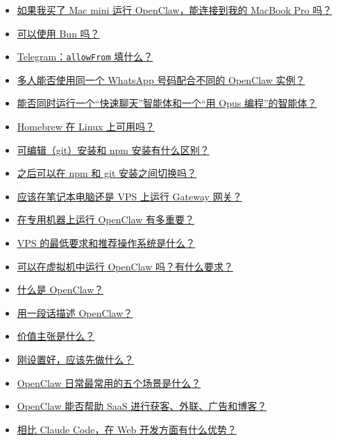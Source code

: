 \begin{itemize}
  \item \href{\#if-i-buy-a-mac-mini-to-run-openclaw-can-i-connect-it-to-my-macbook-pro}{如果我买了 Mac mini 运行 OpenClaw，能连接到我的 MacBook Pro 吗？}
  \item \href{\#can-i-use-bun}{可以使用 Bun 吗？}
  \item \href{\#telegram-what-goes-in-allowfrom}{Telegram：\texttt{allowFrom} 填什么？}
  \item \href{\#can-multiple-people-use-one-whatsapp-number-with-different-openclaw-instances}{多人能否使用同一个 WhatsApp 号码配合不同的 OpenClaw 实例？}
  \item \href{\#can-i-run-a-fast-chat-agent-and-an-opus-for-coding-agent}{能否同时运行一个“快速聊天”智能体和一个“用 Opus 编程”的智能体？}
  \item \href{\#does-homebrew-work-on-linux}{Homebrew 在 Linux 上可用吗？}
  \item \href{\#whats-the-difference-between-the-hackable-git-install-and-npm-install}{可编辑（git）安装和 npm 安装有什么区别？}
  \item \href{\#can-i-switch-between-npm-and-git-installs-later}{之后可以在 npm 和 git 安装之间切换吗？}
  \item \href{\#should-i-run-the-gateway-on-my-laptop-or-a-vps}{应该在笔记本电脑还是 VPS 上运行 Gateway 网关？}
  \item \href{\#how-important-is-it-to-run-openclaw-on-a-dedicated-machine}{在专用机器上运行 OpenClaw 有多重要？}
  \item \href{\#what-are-the-minimum-vps-requirements-and-recommended-os}{VPS 的最低要求和推荐操作系统是什么？}
  \item \href{\#can-i-run-openclaw-in-a-vm-and-what-are-the-requirements}{可以在虚拟机中运行 OpenClaw 吗？有什么要求？}
  \item \href{\#what-is-openclaw}{什么是 OpenClaw？}
  \item \href{\#what-is-openclaw-in-one-paragraph}{用一段话描述 OpenClaw？}
  \item \href{\#whats-the-value-proposition}{价值主张是什么？}
  \item \href{\#i-just-set-it-up-what-should-i-do-first}{刚设置好，应该先做什么？}
  \item \href{\#what-are-the-top-five-everyday-use-cases-for-openclaw}{OpenClaw 日常最常用的五个场景是什么？}
  \item \href{\#can-openclaw-help-with-lead-gen-outreach-ads-and-blogs-for-a-saas}{OpenClaw 能否帮助 SaaS 进行获客、外联、广告和博客？}
  \item \href{\#what-are-the-advantages-vs-claude-code-for-web-development}{相比 Claude Code，在 Web 开发方面有什么优势？}

\end{itemize}
